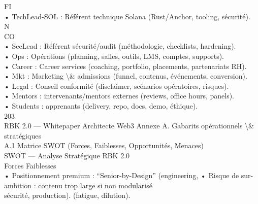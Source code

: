 \documentclass[12pt,landscape,a4paper]{article}
\begin{document}
FI\\
• TechLead-SOL : Référent technique Solana (Rust/Anchor, tooling, sécurité).\\
N\\
CO\\
• SecLead : Référent sécurité/audit (méthodologie, checklists, hardening).\\
\vspace{0.5em}
• Ops : Opérations (planning, salles, outils, LMS, comptes, supports).\\
\vspace{0.5em}
• Career : Career services (coaching, portfolio, placements, partenariats RH).\\
\vspace{0.5em}
• Mkt : Marketing \textbackslash{}& admissions (funnel, contenus, événements, conversion).\\
\vspace{0.5em}
• Legal : Conseil conformité (disclaimer, scénarios opératoires, risques).\\
\vspace{0.5em}
• Mentors : intervenants/mentors externes (reviews, office hours, panels).\\
\vspace{0.5em}
• Students : apprenants (delivery, repo, docs, demo, éthique).\\
\vspace{0.5em}
\vspace{0.5em}
203\\
RBK 2.0 — Whitepaper Architecte Web3                                                           Annexe A. Gabarits opérationnels \textbackslash{}& stratégiques\\
\vspace{0.5em}
\vspace{0.5em}
\vspace{0.5em}
A.1     Matrice SWOT (Forces, Faiblesses, Opportunités, Menaces)\\
SWOT — Analyse Stratégique RBK 2.0\\
\vspace{0.5em}
\vspace{0.5em}
Forces                                                                Faiblesses\\
• Positionnement premium : “Senior-by-Design” (engineering,      • Risque de sur-ambition : contenu trop large si non modularisé\\
sécurité, production).                                           (fatigue, dilution).\\
\end{document}
